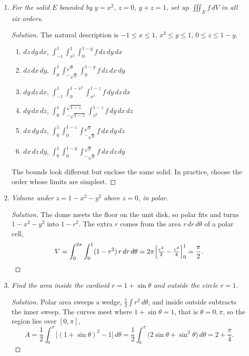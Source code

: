 \documentclass[12pt]{article}
\newenvironment{solution}
  {\renewcommand\qedsymbol{$\blacksquare$}\begin{proof}[Solution]}
  {\end{proof}}
\begin{document}
\begin{enumerate}
\begin{enumerate}
    \item \textit{For the solid $E$ bounded by $y=x^2$, $z=0$, $y+z=1$, set up $\iiint_E f\,dV$ in all six orders.}

    \begin{solution}
    The natural description is $-1\le x\le1$, $x^2\le y\le1$, $0\le z\le1-y$.
    \begin{enumerate}[1.]
      \item $dz\,dy\,dx$, $\displaystyle\int_{-1}^1\int_{x^2}^1\int_0^{1-y}f\,dz\,dy\,dx$
      \item $dz\,dx\,dy$, $\displaystyle\int_0^1\int_{-\sqrt y}^{\sqrt y}\int_0^{1-y}f\,dz\,dx\,dy$
      \item $dy\,dz\,dx$, $\displaystyle\int_{-1}^1\int_0^{1-x^2}\int_{x^2}^{1-z}f\,dy\,dz\,dx$
      \item $dy\,dx\,dz$, $\displaystyle\int_0^1\int_{-\sqrt{1-z}}^{\sqrt{1-z}}\int_{x^2}^{1-z}f\,dy\,dx\,dz$
      \item $dx\,dy\,dz$, $\displaystyle\int_0^1\int_0^{1-z}\int_{-\sqrt y}^{\sqrt y}f\,dx\,dy\,dz$
      \item $dx\,dz\,dy$, $\displaystyle\int_0^1\int_0^{1-y}\int_{-\sqrt y}^{\sqrt y}f\,dx\,dz\,dy$
    \end{enumerate}
    The bounds look different but enclose the same solid. In practice, choose the order whose limits are simplest.
    \end{solution}

    \item \textit{Volume under $z=1-x^2-y^2$ above $z=0$, in polar.}

    \begin{solution}
    The dome meets the floor on the unit disk, so polar fits and turns $1-x^2-y^2$ into $1-r^2$. The extra $r$ comes from the area $r\,dr\,d\theta$ of a polar cell,
    \[
      V=\int_0^{2\pi}\int_0^1(1-r^2)\,r\,dr\,d\theta=2\pi\Bigl[\tfrac{r^2}{2}-\tfrac{r^4}{4}\Bigr]_0^1=\frac{\pi}{2}.
    \]
    \end{solution}

    \item \textit{Find the area inside the cardioid $r=1+\sin\theta$ and outside the circle $r=1$.}

    \begin{solution}
    Polar area sweeps a wedge, $\tfrac12\int r^2\,d\theta$, and inside outside subtracts the inner sweep. The curves meet where $1+\sin\theta=1$, that is $\theta=0,\pi$, so the region lies over $[0,\pi]$,
    \[
      A=\frac12\int_0^\pi\bigl[(1+\sin\theta)^2-1\bigr]\,d\theta=\frac12\int_0^\pi\bigl(2\sin\theta+\sin^2\theta\bigr)\,d\theta=2+\frac{\pi}{4}.
    \]
    \end{solution}


\end{enumerate}
\end{enumerate}
\end{document}
